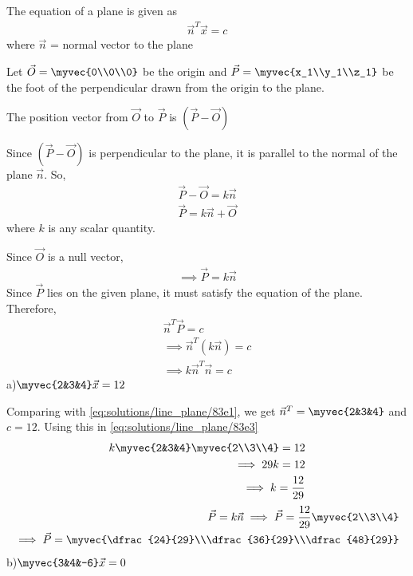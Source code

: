 The equation of a plane is given as
\begin{align}\label{eq:solutions/line_plane/83e1}
    \vec{n}^T\vec{x} = c
\end{align}
where $\vec{n}$ = normal vector to the plane

Let $\vec{O} = \myvec{0\\0\\0}$ be the origin and $\vec{P} = \myvec{x_1\\y_1\\z_1}$ be the foot of the perpendicular drawn from the origin to the plane.

The position vector from $\vec{O}$ to $\vec{P}$ is $(\vec{P} - \vec{O})$

Since $(\vec{P} - \vec{O})$ is perpendicular to the plane, it is parallel to the normal of the plane $\vec{n}$. So,
\begin{align}
    \vec{P} - \vec{O} = k\vec{n}\\
    \vec{P} = k\vec{n} + \vec{O}
\end{align}
where $k$ is any scalar quantity.

Since $\vec{O}$ is a null vector,
\begin{align}\label{eq:solutions/line_plane/83e2}
    \implies\vec{P} = k\vec{n}
\end{align}
Since $\vec{P}$ lies on the given plane, it must satisfy the equation of the plane. Therefore,
\begin{align}
    \vec{n}^T\vec{P} = c\\
    \implies\vec{n}^T(k\vec{n}) = c\\
    \label{eq:solutions/line_plane/83e3}\implies k\vec{n}^T\vec{n} = c
\end{align}
a)$\myvec{2&3&4}\vec{x} = 12$

Comparing with \eqref{eq:solutions/line_plane/83e1}, we get $\vec{n}^T = \myvec{2&3&4}$ and  $c=12$. Using this in \eqref{eq:solutions/line_plane/83e3}
\begin{align}
	k\myvec{2&3&4}\myvec{2\\3\\4} = 12\\
	\implies 29k = 12\\
	\implies k = \frac{12}{29}
\end{align}
\begin{align}
	\vec{P} = k\vec{n}
	\implies\vec{P} = \frac{12}{29}\myvec{2\\3\\4}\\
	\implies\vec{P}= \myvec{\dfrac{24}{29}\\\dfrac{36}{29}\\\dfrac{48}{29}}
\end{align}
b)$\myvec{3&4&-6}\vec{x} = 0$

